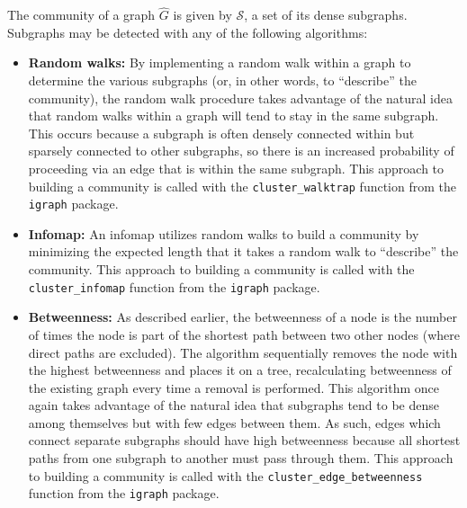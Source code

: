 The community of a graph $\hat{G}$ is given by $\mathcal{S}$, a set of its 
dense subgraphs. Subgraphs may be detected with any of the following algorithms:

\tablespacing
\begin{itemize}
	\item \textbf{Random walks:} By implementing a random walk within a graph 
	to determine the various subgraphs (or, in other words, to ``describe'' the 
	community), the random walk procedure takes advantage of the natural idea 
	that random walks within a graph will tend to stay in the same subgraph. 
	This occurs because a subgraph is often densely connected within but 
	sparsely connected to other subgraphs, so there is an increased probability 
	of proceeding via an edge that is within the same subgraph.
	This approach to building a community is called with the 
	\texttt{cluster\_walktrap} function from the \texttt{igraph} package.	
	
	\item \textbf{Infomap:} An infomap utilizes random walks to build a 
	community by minimizing the expected length that it takes a random walk 
	to ``describe'' the community.
	This approach to building a community is called with the 
	\texttt{cluster\_infomap} function from the \texttt{igraph} package.
	
	\item \textbf{Betweenness:} As described earlier, the betweenness of a node 
	is the number of times the node is part of the shortest path between two 
	other nodes (where direct paths are excluded). The algorithm sequentially 
	removes the node with the highest betweenness and places it on a tree, 
	recalculating betweenness of the existing graph every time a removal is 
	performed. This algorithm once again takes advantage of the natural idea 
	that subgraphs tend to be dense among themselves but with few edges between 
	them. As such, edges which connect separate subgraphs should have high 
	betweenness because all shortest paths from one subgraph to another must 
	pass through them. 
	This approach to building a community is called with the 
	\texttt{cluster\_edge\_betweenness} function from the \texttt{igraph} 
	package.
\end{itemize}
\bodyspacing

